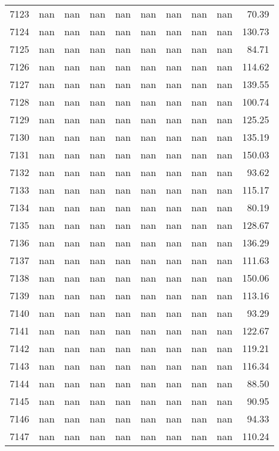 \begin{tabular}{lrrrrrrrrr}
7123 & nan & nan & nan & nan & nan & nan & nan & nan & 70.39 \\
7124 & nan & nan & nan & nan & nan & nan & nan & nan & 130.73 \\
7125 & nan & nan & nan & nan & nan & nan & nan & nan & 84.71 \\
7126 & nan & nan & nan & nan & nan & nan & nan & nan & 114.62 \\
7127 & nan & nan & nan & nan & nan & nan & nan & nan & 139.55 \\
7128 & nan & nan & nan & nan & nan & nan & nan & nan & 100.74 \\
7129 & nan & nan & nan & nan & nan & nan & nan & nan & 125.25 \\
7130 & nan & nan & nan & nan & nan & nan & nan & nan & 135.19 \\
7131 & nan & nan & nan & nan & nan & nan & nan & nan & 150.03 \\
7132 & nan & nan & nan & nan & nan & nan & nan & nan & 93.62 \\
7133 & nan & nan & nan & nan & nan & nan & nan & nan & 115.17 \\
7134 & nan & nan & nan & nan & nan & nan & nan & nan & 80.19 \\
7135 & nan & nan & nan & nan & nan & nan & nan & nan & 128.67 \\
7136 & nan & nan & nan & nan & nan & nan & nan & nan & 136.29 \\
7137 & nan & nan & nan & nan & nan & nan & nan & nan & 111.63 \\
7138 & nan & nan & nan & nan & nan & nan & nan & nan & 150.06 \\
7139 & nan & nan & nan & nan & nan & nan & nan & nan & 113.16 \\
7140 & nan & nan & nan & nan & nan & nan & nan & nan & 93.29 \\
7141 & nan & nan & nan & nan & nan & nan & nan & nan & 122.67 \\
7142 & nan & nan & nan & nan & nan & nan & nan & nan & 119.21 \\
7143 & nan & nan & nan & nan & nan & nan & nan & nan & 116.34 \\
7144 & nan & nan & nan & nan & nan & nan & nan & nan & 88.50 \\
7145 & nan & nan & nan & nan & nan & nan & nan & nan & 90.95 \\
7146 & nan & nan & nan & nan & nan & nan & nan & nan & 94.33 \\
7147 & nan & nan & nan & nan & nan & nan & nan & nan & 110.24 \\

\end{tabular}
